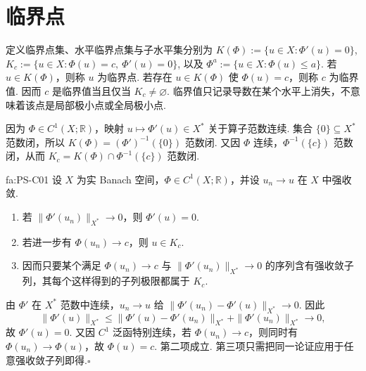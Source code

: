 \section{临界点}\label{sec:iii09-critical-points}

定义临界点集、水平临界点集与子水平集分别为
\(\displaystyle K(\Phi):=\{u\in X:\Phi'(u)=0\}\),
\(\displaystyle K_c:=\{u\in X:\Phi(u)=c,\ \Phi'(u)=0\}\),
以及
\(\displaystyle \Phi^a:=\{u\in X:\Phi(u)\leqslant a\}\).
若 \(\displaystyle u\in K(\Phi)\)，则称 \(\displaystyle u\) 为临界点. 若存在 \(\displaystyle u\in K(\Phi)\) 使 \(\displaystyle\Phi(u)=c\)，则称 \(\displaystyle c\) 为临界值. 因而 \(\displaystyle c\) 是临界值当且仅当 \(\displaystyle K_c\neq\varnothing\). 临界值只记录导数在某个水平上消失，不意味着该点是局部极小点或全局极小点.

因为 \(\displaystyle\Phi\in C^1(X;\mathbb R)\)，映射 \(\displaystyle u\mapsto\Phi'(u)\in X^*\) 关于算子范数连续. 集合 \(\displaystyle\{0\}\subseteq X^*\) 范数闭，所以 \(\displaystyle K(\Phi)=(\Phi')^{-1}(\{0\})\) 范数闭. 又因 \(\displaystyle \Phi\) 连续，\(\displaystyle \Phi^{-1}(\{c\})\) 范数闭，从而 \(\displaystyle K_c=K(\Phi)\cap\Phi^{-1}(\{c\})\) 范数闭.

\begin{FAProposition}{fa:PS-C01}
设 \(\displaystyle X\) 为实 Banach 空间，\(\displaystyle\Phi\in C^1(X;\mathbb R)\)，并设 \(\displaystyle u_n\to u\) 在 \(\displaystyle X\) 中强收敛.
\begin{enumerate}
\item 若 \(\displaystyle\|\Phi'(u_n)\|_{X^*}\to0\)，则 \(\displaystyle\Phi'(u)=0\).
\item 若进一步有 \(\displaystyle\Phi(u_n)\to c\)，则 \(\displaystyle u\in K_c\).
\item 因而只要某个满足 \(\displaystyle\Phi(u_n)\to c\) 与 \(\displaystyle\|\Phi'(u_n)\|_{X^*}\to0\) 的序列含有强收敛子列，其每个这样得到的子列极限都属于 \(\displaystyle K_c\).
\end{enumerate}
\end{FAProposition}

\begin{FAProof}
由 \(\displaystyle\Phi'\) 在 \(\displaystyle X^*\) 范数中连续，\(\displaystyle u_n\to u\) 给
\(\displaystyle \|\Phi'(u_n)-\Phi'(u)\|_{X^*}\longrightarrow0\).
因此
\[
\|\Phi'(u)\|_{X^*}
\leqslant
\|\Phi'(u)-\Phi'(u_n)\|_{X^*}
+
\|\Phi'(u_n)\|_{X^*}
\longrightarrow0,
\]
故 \(\displaystyle\Phi'(u)=0\). 又因 \(\displaystyle C^1\) 泛函特别连续，若 \(\displaystyle\Phi(u_n)\to c\)，则同时有 \(\displaystyle\Phi(u_n)\to\Phi(u)\)，故 \(\displaystyle\Phi(u)=c\). 第二项成立. 第三项只需把同一论证应用于任意强收敛子列即得.\hfill\(\square\)
\end{FAProof}

